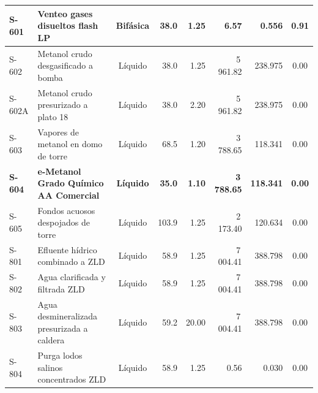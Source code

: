 \documentclass[10pt,letterpaper]{article}
\begin{document}
\begin{landscape}
\begin{xltabular}{\linewidth}{|l|p{6.0cm}|c|r|r|r|r|c|}
S-601 & Venteo gases disueltos flash LP & Bifásica & 38.0 & 1.25 & 6.57 & 0.556 & 0.91 \\ \hline
S-602 & Metanol crudo desgasificado a bomba & Líquido & 38.0 & 1.25 & 5\,961.82 & 238.975 & 0.00 \\ \hline
S-602A & Metanol crudo presurizado a plato 18 & Líquido & 38.0 & 2.20 & 5\,961.82 & 238.975 & 0.00 \\ \hline
S-603 & Vapores de metanol en domo de torre & Líquido & 68.5 & 1.20 & 3\,788.65 & 118.341 & 0.00 \\ \hline
\textbf{S-604} & \textbf{e-Metanol Grado Químico AA Comercial} & \textbf{Líquido} & \textbf{35.0} & \textbf{1.10} & \textbf{3\,788.65} & \textbf{118.341} & \textbf{0.00} \\ \hline
S-605 & Fondos acuosos despojados de torre & Líquido & 103.9 & 1.25 & 2\,173.40 & 120.634 & 0.00 \\ \hline
S-801 & Efluente hídrico combinado a ZLD & Líquido & 58.9 & 1.25 & 7\,004.41 & 388.798 & 0.00 \\ \hline
S-802 & Agua clarificada y filtrada ZLD & Líquido & 58.9 & 1.25 & 7\,004.41 & 388.798 & 0.00 \\ \hline
S-803 & Agua desmineralizada presurizada a caldera & Líquido & 59.2 & 20.00 & 7\,004.41 & 388.798 & 0.00 \\ \hline
S-804 & Purga lodos salinos concentrados ZLD & Líquido & 58.9 & 1.25 & 0.56 & 0.030 & 0.00 \\ \hline
\end{xltabular}
\end{landscape}
\end{document}
